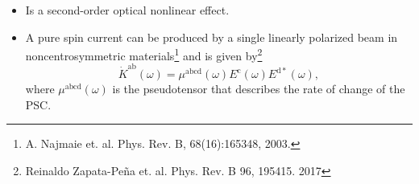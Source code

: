 \documentclass{beamer}
\begin{document}
\begin{frame}
\begin{columns}
\begin{figure}[h!]
\end{figure}


\end{columns}

\end{frame}


\begin{frame}



\vspace{3mm}

\begin{itemize}

\item 
Is a second-order optical nonlinear effect.

\vspace{3mm}

\item 
A pure spin current can be produced by a single linearly polarized beam in
noncentrosymmetric materials\footnote[frame]{\tiny A. Najmaie
et. al. Phys. Rev. B, 68(16):165348, 2003.} and is given by\footnote[frame]
{\tiny Reinaldo Zapata-Pe\~na et. al. Phys. Rev. B 96, 195415. 2017}
\begin{equation}\label{eq:psc}
\dot{K}^{\mathrm{ab}}(\omega) =
\mu^{\mathrm{abcd}}(\omega)
E^{\mathrm{c}}(\omega) E^{\mathrm{d*}}(\omega),
\end{equation}
where $\mu^{\mathrm{abcd}}(\omega)$ is the pseudotensor that describes the rate
of change of the PSC.

\end{itemize}

\end{frame}
\end{document}
